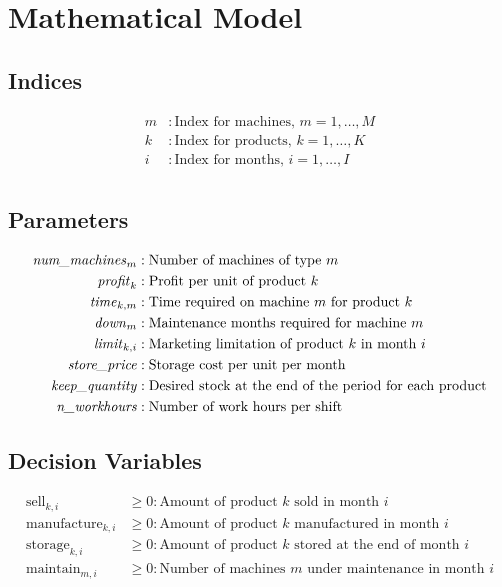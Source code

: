 \documentclass{article}
\begin{document}
\section*{Mathematical Model}

\subsection*{Indices}
\begin{align*}
m & : \text{Index for machines, } m = 1, \ldots, M \\
k & : \text{Index for products, } k = 1, \ldots, K \\
i & : \text{Index for months, } i = 1, \ldots, I \\
\end{align*}

\subsection*{Parameters}
\begin{align*}
\text{\textit{num\_machines}}_m &: \text{Number of machines of type } m \\
\text{\textit{profit}}_k &: \text{Profit per unit of product } k \\
\text{\textit{time}}_{k,m} &: \text{Time required on machine } m \text{ for product } k \\
\text{\textit{down}}_m &: \text{Maintenance months required for machine } m \\
\text{\textit{limit}}_{k,i} &: \text{Marketing limitation of product } k \text{ in month } i \\
\text{\textit{store\_price}} &: \text{Storage cost per unit per month} \\
\text{\textit{keep\_quantity}} &: \text{Desired stock at the end of the period for each product} \\
\text{\textit{n\_workhours}} &: \text{Number of work hours per shift} \\
\end{align*}

\subsection*{Decision Variables}
\begin{align*}
\text{sell}_{k,i} &\geq 0 : \text{Amount of product } k \text{ sold in month } i \\
\text{manufacture}_{k,i} &\geq 0 : \text{Amount of product } k \text{ manufactured in month } i \\
\text{storage}_{k,i} &\geq 0 : \text{Amount of product } k \text{ stored at the end of month } i \\
\text{maintain}_{m,i} &\geq 0 : \text{Number of machines } m \text{ under maintenance in month } i \\
\end{align*}
\end{document}
